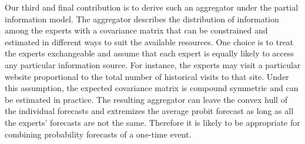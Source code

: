 \documentclass[11pt]{article}
\theoremstyle{definition}
\theoremstyle{definition}
\begin{document}
Our third and final contribution is to derive such an aggregator under the partial information model. The aggregator describes the distribution of information among the experts with a covariance matrix that can be constrained and estimated in different ways to suit the available resources. One choice is to treat the experts exchangeable and assume that each expert is equally likely to access any particular information source. For instance, the experts may visit a particular website proportional to the total number of historical visits to that site. Under this assumption, the expected covariance matrix is compound symmetric and can be estimated in practice. 
The resulting aggregator can leave the convex hull of the individual forecasts and extremizes the average probit forecast as long as all the experts' forecasts are not the same. Therefore it is likely to be appropriate for combining probability forecasts of a one-time event.



 
 
 




\end{document}

